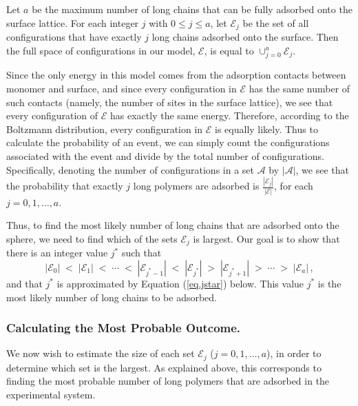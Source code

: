 \documentclass[twoside,twocolumn,9pt]{article}
\begin{document}
Let $a$ be the maximum number of long chains that
can be fully adsorbed onto the surface lattice.
For each integer $j$ with $0\leq j\leq a$, let
$\mathcal{E}_j$ be the set of all configurations that have exactly $j$ long chains adsorbed 
onto the surface.  
Then the full space of configurations in our model,
$\mathcal{E}$, is equal to 
$\cup_{j=0}^a {\mathcal{E}_j}$. 

Since the only energy in this model comes from the adsorption contacts between monomer and surface,
and since every configuration in $\mathcal{E}$ has the same number of such contacts
(namely, the number of sites in the surface lattice),
we see that every configuration of $\mathcal{E}$ has exactly the same energy.
Therefore, according to the Boltzmann distribution, every configuration in $\mathcal{E}$ is equally
likely. Thus to calculate the probability of an event, we can simply count the configurations associated with the event and divide by the total number of configurations.
Specifically, denoting the number of configurations in a set $\mathcal{A}$ by $|\mathcal{A}|$, we see that
the probability that exactly $j$ long polymers are adsorbed is $\frac{|\mathcal{E}_j|}{|\mathcal{E}|}$,
for each $j=0,1,\ldots,a$.

Thus, to find the most likely number of long chains %
that are adsorbed onto the sphere, we need to 
find which of the sets $\mathcal{E}_j$ is largest.
Our goal is to show that there is an integer value $j^*$
such that
\begin{equation}
    \label{eq.EEcomp}
  |\mathcal{E}_0| \;<\; |\mathcal{E}_1|\; < \; 
 \cdots\; < \; 
  |\mathcal{E}_{j^*-1}|\; < \;|\mathcal{E}_{j^*}|\; >
    \; |\mathcal{E}_{j^*+1}| \;>\; \cdots \; > \; |\mathcal{E}_a|\,,
\end{equation}
and that $j^*$ is approximated by Equation (\ref{eq.jstar}) below.  
This value $j^*$ is the most likely
number of long chains to be adsorbed.


\subsubsection{Calculating the Most Probable Outcome.}   %
    \label{sec-calcMPO}

We now wish to estimate the size of each set $\mathcal{E}_j$ ($j=0,1,\ldots,a$), in order to  determine which set is the largest.  
As explained above, this corresponds to finding the most probable number of 
long polymers that are adsorbed in the experimental system. 
\end{document}
